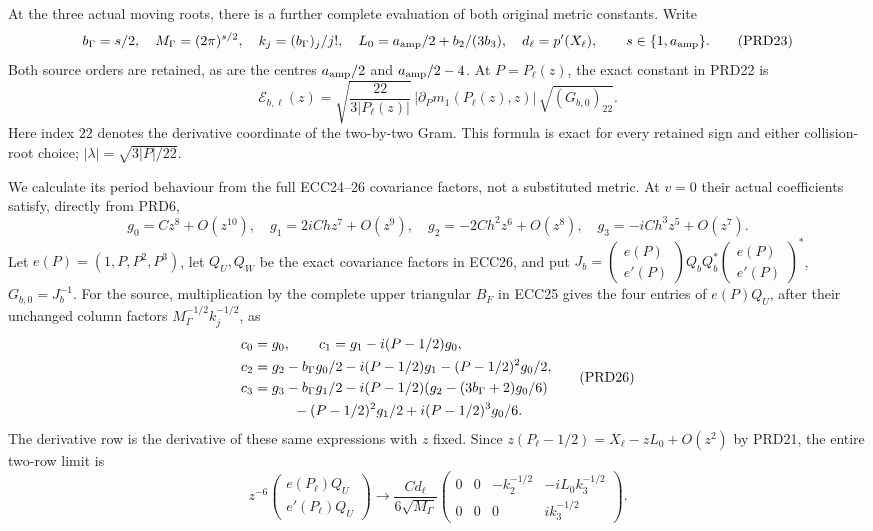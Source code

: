 \documentclass[11pt]{article}
\begin{document}
At the three actual moving roots, there is a further complete
evaluation of both original metric constants. Write
\[
 b_\Gamma=s/2,\quad M_\Gamma=(2\pi)^{s/2},\quad
 k_j=(b_\Gamma)_j/j!,\quad
 L_0=a_{\rm amp}/2+b_2/(3b_3),\quad
 d_\ell=p'(X_\ell),
 \qquad s\in\{1,a_{\rm amp}\}.
 \tag{PRD23}
\]
Both source orders are retained, as are the centres
$a_{\rm amp}/2$ and $a_{\rm amp}/2-4$.
At $P=P_\ell(z)$, the exact constant in PRD22 is
\[
 \mathcal E_{b,\ell}(z)=
 \sqrt{\frac{22}{3|P_\ell(z)|}}\,
 |\partial_Pm_1(P_\ell(z),z)|\,
                  \sqrt{(G_{b,0})_{22}}.
 \tag{PRD24}
\]
Here index $22$ denotes the derivative coordinate of the two-by-two
Gram. This formula is exact for every retained sign and either
collision-root choice; $|\lambda|=\sqrt{3|P|/22}$.

We calculate its period behaviour from the full ECC24--26
covariance factors, not a substituted metric. At $v=0$ their
actual coefficients satisfy, directly from PRD6,
\[
 g_0=Cz^8+O(z^{10}),\quad
 g_1=2iChz^7+O(z^9),\quad
 g_2=-2Ch^2z^6+O(z^8),\quad
 g_3=-iCh^3z^5+O(z^7).
 \tag{PRD25}
\]
Let $e(P)=(1,P,P^2,P^3)$, let $Q_U,Q_W$ be the exact
covariance factors in ECC26, and put
$J_b=\left(\begin{smallmatrix}e(P)\\e'(P)\end{smallmatrix}\right)
Q_bQ_b^*
\left(\begin{smallmatrix}e(P)\\e'(P)\end{smallmatrix}\right)^*$,
$G_{b,0}=J_b^{-1}$.
For the source, multiplication by the complete upper triangular
$B_F$ in ECC25 gives the four entries of $e(P)Q_U$, after their
unchanged column factors $M_\Gamma^{-1/2}k_j^{-1/2}$, as
\[
\begin{split}
 c_0&=g_0,\qquad c_1=g_1-i(P-1/2)g_0,\\
 c_2&=g_2-b_\Gamma g_0/2-i(P-1/2)g_1
                                      -(P-1/2)^2g_0/2,\\
 c_3&=g_3-b_\Gamma g_1/2
       -i(P-1/2)(g_2-(3b_\Gamma+2)g_0/6)\\
    &\hspace{10mm}-(P-1/2)^2g_1/2+i(P-1/2)^3g_0/6.
\end{split}\tag{PRD26}
\]
The derivative row is the derivative of these same expressions
with $z$ fixed. Since
$z(P_\ell-1/2)=X_\ell-zL_0+O(z^2)$ by PRD21,
the entire two-row limit is
\[
 z^{-6}\begin{pmatrix}e(P_\ell)Q_U\\e'(P_\ell)Q_U\end{pmatrix}
 \longrightarrow
 \frac{Cd_\ell}{6\sqrt{M_\Gamma}}
 \begin{pmatrix}
 0&0&-k_2^{-1/2}&-iL_0k_3^{-1/2}\\
 0&0&0&i k_3^{-1/2}
 \end{pmatrix}.
 \tag{PRD27}
\]
\end{document}
